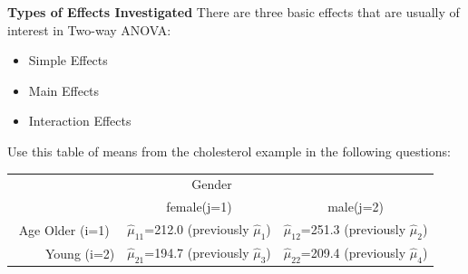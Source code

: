 \newpage


\textbf{Types of Effects Investigated}
There are three basic effects that are usually of interest in Two-way ANOVA:
\begin{itemize}
\item Simple Effects
\item Main Effects
\item Interaction Effects
\end{itemize}
Use this table of means from the cholesterol example in the following questions:
\begin{center}
\begin{tabular}{c|cc}
&~~~~Gender\\
&female(j=1) &male(j=2)\\\hline
Age Older (i=1) & $\hat{\mu}_{11}$=212.0 (previously $\hat{\mu}_{1}$)& $\hat{\mu}_{12}$=251.3 (previously $\hat{\mu}_{2}$)\\
~~~~~Young (i=2) & $\hat{\mu}_{21}$=194.7 (previously $\hat{\mu}_{3}$)& $\hat{\mu}_{22}$=209.4 (previously $\hat{\mu}_{4}$)
\end{tabular}
\end{center}

